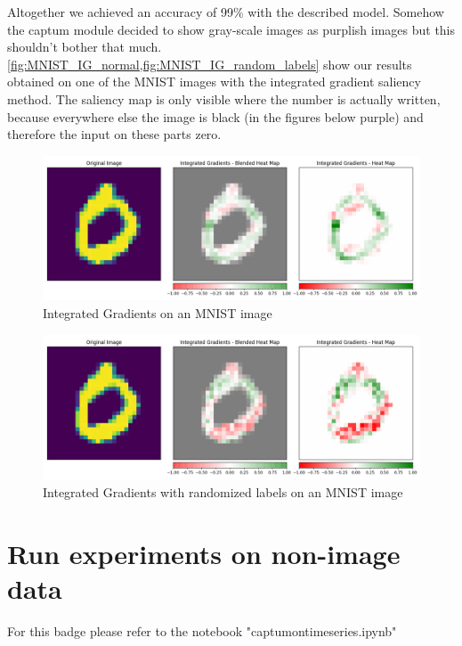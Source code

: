 \documentclass{article}
\begin{document}
Altogether we achieved an accuracy of 99\% with the described model. Somehow the captum module decided to show gray-scale images as purplish images but this shouldn't bother that much. \\

\cref{fig:MNIST_IG_normal,fig:MNIST_IG_random_labels} show our results obtained on one of the MNIST images with the integrated gradient saliency method. The saliency map is only visible where the number is actually written, because everywhere else the image is black (in the figures below purple) and therefore the input on these parts zero.

\begin{figure}[h!]
\centering
\includegraphics[width=\textwidth]{results/MNIST_IG_normal.png}
\caption{Integrated Gradients on an MNIST image}
\label{fig:MNIST_IG_normal}
\end{figure}

\begin{figure}[h!]
\centering
\includegraphics[width=\textwidth]{results/MNIST_IG_random_labels.png}
\caption{Integrated Gradients with randomized labels on an MNIST image}
\label{fig:MNIST_IG_random_labels}
\end{figure}

\clearpage



\section{Run experiments on non-image data}
For this badge please refer to the notebook "captum\textunderscore on\textunderscore timeseries.ipynb" 
\end{document}
